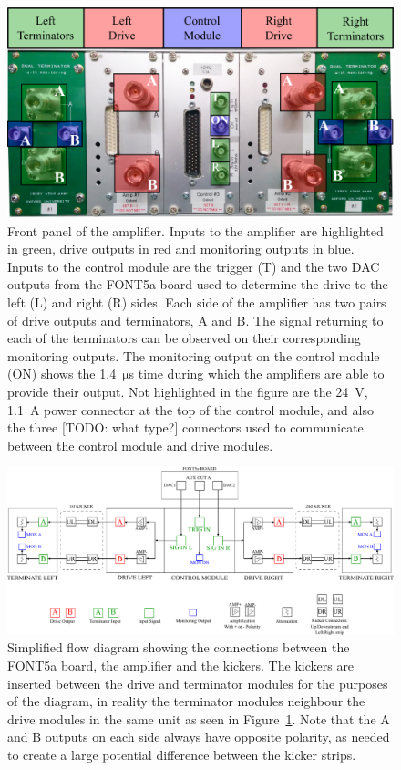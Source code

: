 \begin{landscape}
\begin{figure}
  \centering
  \includegraphics[width=0.9\hsize]{Figures/commissioning/AmplifierPanelPic}
  \caption{Front panel of the amplifier. Inputs to the amplifier are highlighted in green, drive outputs in red and monitoring outputs in blue. Inputs to the control module are the trigger (T) and the two DAC outputs from the FONT5a board used to determine the drive to the left (L) and right (R) sides. Each side of the amplifier has two pairs of drive outputs and terminators, A and B. The signal returning to each of the terminators can be observed on their corresponding monitoring outputs. The monitoring output on the control module (ON) shows the 1.4~\(\mathrm{\mu}\)s time during which the amplifiers are able to provide their output. Not highlighted in the figure are the 24~V, 1.1~A power connector at the top of the control module, and also the three [TODO: what type?] connectors used to communicate between the control module and drive modules.}
  \label{f:AmplifierPanelPic}
\end{figure}
\end{landscape}

\begin{landscape}
\begin{figure}
  \centering
  \includegraphics[width=\hsize]{Figures/commissioning/amplifierDiagram}
  \caption{Simplified flow diagram showing the connections between the FONT5a board, the amplifier and the kickers. The kickers are inserted between the drive and terminator modules for the purposes of the diagram, in reality the terminator modules neighbour the drive modules in the same unit as seen in Figure~\ref{f:AmplifierPanelPic}. Note that the A and B outputs on each side always have opposite polarity, as needed to create a large potential difference between the kicker strips.}
  \label{f:amplifierDiagram}
\end{figure}
\end{landscape}



